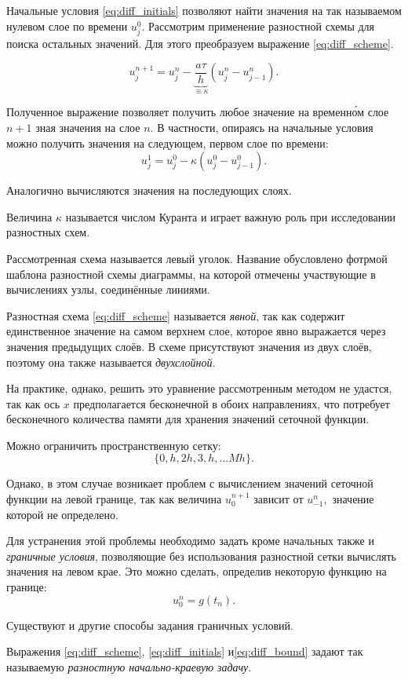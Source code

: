 Начальные условия \eqref{eq:diff_initials} позволяют найти значения
на так называемом нулевом слое по времени \textemdash{} $u_{j}^{0}.$
Рассмотрим применение разностной схемы для поиска остальных значений.
Для этого преобразуем выражение \eqref{eq:diff_scheme}.

\[
u_{j}^{n+1}=u_{j}^{n}-\underbrace{\frac{a\tau}{h}}_{\equiv\kappa}(u_{j}^{n}-u_{j-1}^{n}).
\]


Полученное выражение позволяет получить любое значение на временн\'{о}м
слое $n+1$ зная значения на слое $n.$ В частности, опираясь на начальные
условия можно получить значения на следующем, первом слое по времени:
\[
u_{j}^{1}=u_{j}^{0}-\kappa(u_{j}^{0}-u_{j-1}^{0}).
\]


Аналогично вычисляются значения на последующих слоях.

Величина $\kappa$ называется числом Куранта и играет важную роль
при исследовании разностных схем.

Рассмотренная схема называется \guillemotleft{}левый уголок\guillemotright{}.
Название обусловлено фотрмой шаблона разностной схемы \textemdash{}
диаграммы, на которой отмечены участвующие в вычислениях узлы, соединённые
линиями.

Разностная схема \eqref{eq:diff_scheme} называется \emph{явной},
так как содержит единственное значение на самом верхнем слое, которое
явно выражается через значения предыдущих слоёв. В схеме присутствуют
значения из двух слоёв, поэтому она также называется \emph{двухслойной}.

На практике, однако, решить это уравнение рассмотренным методом не
удастся, так как ось $x$ предполагается бесконечной в обоих направлениях,
что потребует бесконечного количества памяти для хранения значений
сеточной функции.

Можно ограничить пространственную сетку:
\[
\{0,h,2h,3,h,\dots Mh\}.
\]


Однако, в этом случае возникает проблем с вычислением значений сеточной
функции на левой границе, так как величина $u_{0}^{n+1}$ зависит
от $u_{-1}^{n},$ значение которой не определено.

Для устранения этой проблемы необходимо задать кроме начальных также
и \emph{граничные условия}, позволяющие без использования разностной
сетки вычислять значения на левом крае. Это можно сделать, определив
некоторую функцию на границе:
\begin{equation}
u_{0}^{n}=g(t_{n}).\label{eq:diff_bound}
\end{equation}


Существуют и другие способы задания граничных условий.

Выражения \eqref{eq:diff_scheme}, \eqref{eq:diff_initials} и\eqref{eq:diff_bound}
задают так называемую \emph{разностную начально-краевую задачу}.

\Practice

\Tasks

\Questions

